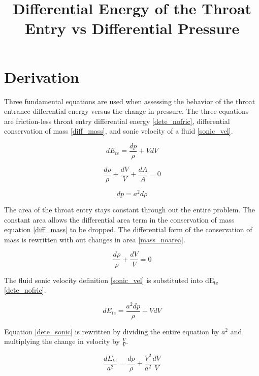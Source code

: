 \documentclass{article}
\title{Differential Energy of the Throat Entry vs Differential Pressure}
\newcommand{\dete}{$\mathrm{dE_{te}}$ }  %
\begin{document}
\maketitle

\section{Derivation}

Three fundamental equations are used when assessing the behavior of the throat entrance differential energy versus the change in pressure. The three equations are friction-less throat entry differential energy \eqref{dete_nofric}, differential conservation of mass \eqref{diff_mass}, and sonic velocity of a fluid \eqref{sonic_vel}.

\begin{equation}
dE_{te} = \frac{dp}{\rho} + VdV
\label{dete_nofric}
\end{equation}

\begin{equation}
\frac{d\rho}{\rho} + \frac{dV}{V} + \frac{dA}{A} = 0
\label{diff_mass}
\end{equation}

\begin{equation}
dp = a^2d\rho
\label{sonic_vel}
\end{equation}

The area of the throat entry stays constant through out the entire problem. The constant area allows the differential area term in the conservation of mass equation \eqref{diff_mass} to be dropped. The differential form of the conservation of mass is rewritten with out changes in area \eqref{mass_noarea}.

\begin{equation}
\frac{d\rho}{\rho} + \frac{dV}{V} = 0
\label{mass_noarea}
\end{equation}

The fluid sonic velocity definition \eqref{sonic_vel} is substituted into \dete \eqref{dete_nofric}.

\begin{equation}
dE_{te} = \frac{a^{2}dp}{\rho} + VdV
\label{dete_sonic}
\end{equation}

Equation \eqref{dete_sonic} is rewritten by dividing the entire equation by $a^{2}$ and multiplying the change in velocity by $\frac{V}{V}$.

\begin{equation}
\frac{dE_{te}}{a^{2}} = \frac{dp}{\rho} + \frac{V^2}{a^2}\frac{dV}{V}
\label{dete_complex}
\end{equation}
\end{document}
